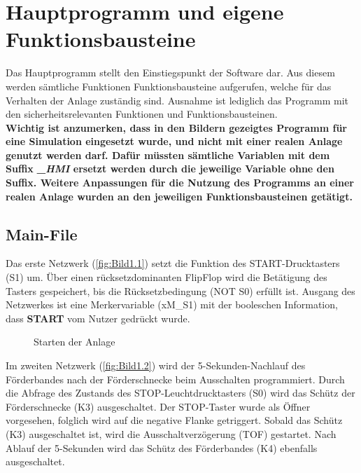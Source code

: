 \section{Hauptprogramm und eigene Funktionsbausteine}

Das Hauptprogramm stellt den Einstiegspunkt der Software dar. Aus diesem werden sämtliche Funktionen \bzw Funktionsbausteine aufgerufen, welche für das Verhalten der Anlage zuständig sind. Ausnahme ist lediglich das Programm mit den sicherheitsrelevanten Funktionen und Funktionsbausteinen.\\
\textbf{Wichtig ist anzumerken, dass in den Bildern gezeigtes Programm für eine Simulation eingesetzt wurde, und nicht mit einer realen Anlage genutzt werden darf. Dafür müssten sämtliche Variablen mit dem Suffix \textit{\glqq \_HMI\grqq{}} ersetzt werden durch die jeweilige Variable ohne den Suffix. Weitere Anpassungen für die Nutzung des Programms an einer realen Anlage wurden an den jeweiligen Funktionsbausteinen getätigt.}

\subsection{Main-File}

Das erste Netzwerk (\autoref{fig:Bild1.1}) setzt die Funktion des START-Drucktasters (S1) um. Über einen rücksetzdominanten FlipFlop wird die Betätigung des Tasters gespeichert, bis die Rücksetzbedingung (NOT S0) erfüllt ist. Ausgang des Netzwerkes ist eine Merkervariable (xM\_S1) mit der booleschen Information, dass \textbf{START} vom Nutzer gedrückt wurde.

\begin{figure}[H]
   \centering
   \caption[Starten der Anlage]{Starten der Anlage}
   \label{fig:Bild1.1}
\end{figure}

Im zweiten Netzwerk (\autoref{fig:Bild1.2}) wird der 5-Sekunden-Nachlauf des Förderbandes nach der Förderschnecke beim Ausschalten programmiert. Durch die Abfrage des Zustands des STOP-Leuchtdrucktasters (S0) wird das Schütz der Förderschnecke (K3) ausgeschaltet. Der STOP-Taster wurde als Öffner vorgesehen, folglich wird auf die negative Flanke getriggert. Sobald das Schütz (K3) ausgeschaltet ist, wird die Ausschaltverzögerung (TOF) gestartet. Nach Ablauf der 5-Sekunden wird das Schütz des Förderbandes (K4) ebenfalls ausgeschaltet.

